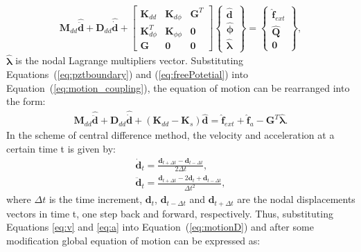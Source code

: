 \begin{eqnarray}
	\label{eq:motion_coupling}
	\textbf{M}_{dd} \widehat{\ddot{\textbf{d}}} +
	\textbf{D}_{dd}	\widehat{\dot{\textbf{d}}} +
	\left [\begin{array}{ccc}
		\textbf{K}_{dd}&\textbf{K}_{d\phi}&\textbf{G}^T\\
		\textbf{K}_{d\phi}^T&\textbf{K}_{\phi \phi}&\textbf{0}\\
		\textbf{G}&\textbf{0}&\textbf{0}
	\end{array}\right]
	\left \{\begin{array}{c}
		\widehat{\textbf{d}}\\
		\widehat{\boldsymbol{\phi}}\\
		\widehat{\boldsymbol{\lambda}}
	\end{array}\right\} =
	\left \{\begin{array}{c}
		\widehat{\textbf{f}}_{ext} \\
		\widehat{\textbf{Q}}\\
		\textbf{0}
	\end{array}\right \},
\end{eqnarray}
\(\widehat{\boldsymbol{\lambda}}\) is the nodal Lagrange multipliers vector.
Substituting Equations~(\ref{eq:pztboundary}) and (\ref{eq:freePotetial}) into Equation~(\ref{eq:motion_coupling}), the equation of motion can be rearranged into the form:
\begin{eqnarray}
	\textbf{M}_{dd} \widehat{\ddot{\textbf{d}}} + \textbf{D}_{dd} \widehat{\dot{\textbf{d}}} + (\textbf{K}_{dd}-\textbf{K}_{s}) \widehat{\textbf{d}}  = \widehat{\textbf{f}}_{ext} + \widehat{\textbf{f}}_{a} - \textbf{G}^T \widehat{\boldsymbol{\lambda}}.
	\label{eq:motionD}
\end{eqnarray}
In the scheme of central difference method, the velocity and acceleration at a certain time t is given by:
\begin{eqnarray}
	\label{eq:v}
	\dot{\textbf{d}}_{t} = \frac{\textbf{d}_{t+\Delta t} - \textbf{d}_{t-\Delta t}}{2\Delta t},\\
	\label{eq:a}
	\ddot{\textbf{d}}_{t} = \frac{\textbf{d}_{t+\Delta t} - 2\textbf{d}_{t} + \textbf{d}_{t-\Delta t}}{\Delta t^2},
\end{eqnarray}
where \(\Delta t\) is the time increment, \(\textbf{d}_{t}\), \(\textbf{d}_{t-\Delta t}\) and \(\textbf{d}_{t+\Delta t}\) are the nodal displacements vectors in time t, one step back and forward, respectively. 
Thus, substituting Equations \ref{eq:v} and \ref{eq:a} into Equation~(\ref{eq:motionD}) and after some modification global equation of motion can be expressed as:
